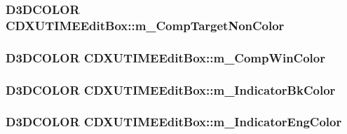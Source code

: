 \label{class_c_d_x_u_t_i_m_e_edit_box_a7bf58b958e0e9dc439c4e3c5f75998b0}
\hypertarget{class_c_d_x_u_t_i_m_e_edit_box_ad1285ec420c985d70b5bdb093da16594}{
\subsubsection[{m\_\-CompTargetNonColor}]{\setlength{\rightskip}{0pt plus 5cm}D3DCOLOR {\bf CDXUTIMEEditBox::m\_\-CompTargetNonColor}}}
\label{class_c_d_x_u_t_i_m_e_edit_box_ad1285ec420c985d70b5bdb093da16594}
\hypertarget{class_c_d_x_u_t_i_m_e_edit_box_a176310771bab6938087f89b678400ba2}{
\subsubsection[{m\_\-CompWinColor}]{\setlength{\rightskip}{0pt plus 5cm}D3DCOLOR {\bf CDXUTIMEEditBox::m\_\-CompWinColor}}}
\label{class_c_d_x_u_t_i_m_e_edit_box_a176310771bab6938087f89b678400ba2}
\hypertarget{class_c_d_x_u_t_i_m_e_edit_box_a19e7f372fee68a764208a5d7f32d7e37}{
\subsubsection[{m\_\-IndicatorBkColor}]{\setlength{\rightskip}{0pt plus 5cm}D3DCOLOR {\bf CDXUTIMEEditBox::m\_\-IndicatorBkColor}}}
\label{class_c_d_x_u_t_i_m_e_edit_box_a19e7f372fee68a764208a5d7f32d7e37}
\hypertarget{class_c_d_x_u_t_i_m_e_edit_box_ac905236eb64b937da8a2756bd78473ae}{
\subsubsection[{m\_\-IndicatorEngColor}]{\setlength{\rightskip}{0pt plus 5cm}D3DCOLOR {\bf CDXUTIMEEditBox::m\_\-IndicatorEngColor}}}
